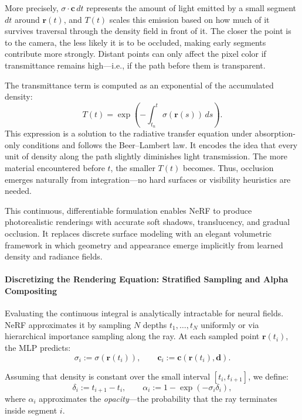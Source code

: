 \medskip

\noindent
More precisely, \( \sigma \cdot \mathbf{c} \, dt \) represents the amount of light emitted by a small segment \( dt \) around \( \mathbf{r}(t) \), and \( T(t) \) scales this emission based on how much of it survives traversal through the density field in front of it. The closer the point is to the camera, the less likely it is to be occluded, making early segments contribute more strongly. Distant points can only affect the pixel color if transmittance remains high—i.e., if the path before them is transparent.

\medskip

\noindent
The transmittance term is computed as an exponential of the accumulated density:
\[
T(t) = \exp\left( -\int_{t_n}^{t} \sigma(\mathbf{r}(s)) \, ds \right).
\]
This expression is a solution to the radiative transfer equation under absorption-only conditions and follows the Beer–Lambert law. It encodes the idea that every unit of density along the path slightly diminishes light transmission. The more material encountered before \( t \), the smaller \( T(t) \) becomes. Thus, occlusion emerges naturally from integration—no hard surfaces or visibility heuristics are needed.

\medskip

\noindent
This continuous, differentiable formulation enables NeRF to produce photorealistic renderings with accurate soft shadows, translucency, and gradual occlusion. It replaces discrete surface modeling with an elegant volumetric framework in which geometry and appearance emerge implicitly from learned density and radiance fields.

\paragraph{Discretizing the Rendering Equation: Stratified Sampling and Alpha Compositing}

Evaluating the continuous integral is analytically intractable for neural fields. NeRF approximates it by sampling \( N \) depths \( t_1, \dots, t_N \) uniformly or via hierarchical importance sampling along the ray. At each sampled point \( \mathbf{r}(t_i) \), the MLP predicts:
\[
\sigma_i := \sigma(\mathbf{r}(t_i)), \qquad \mathbf{c}_i := \mathbf{c}(\mathbf{r}(t_i), \mathbf{d}).
\]

Assuming that density is constant over the small interval \( [t_i, t_{i+1}] \), we define:
\[
\delta_i := t_{i+1} - t_i, \qquad \alpha_i := 1 - \exp(-\sigma_i \delta_i),
\]
where \( \alpha_i \) approximates the \emph{opacity}—the probability that the ray terminates inside segment \( i \).

